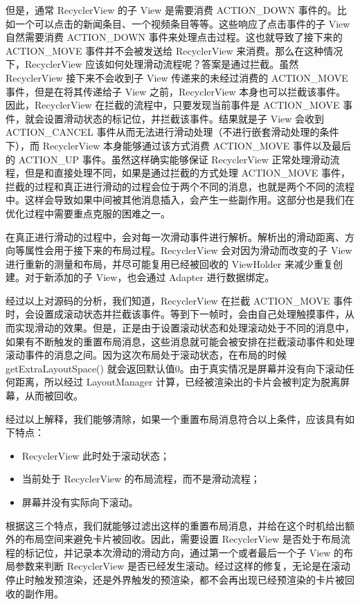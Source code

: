 但是，通常 RecyclerView 的子 View 是需要消费 ACTION\_DOWN 事件的。比如一个可以点击的新闻条目、一个视频条目等等。这些响应了点击事件的子 View 自然需要消费 ACTION\_DOWN 事件来处理点击过程。这也就导致了接下来的 ACTION\_MOVE 事件并不会被发送给 RecyclerView 来消费。那么在这种情况下，RecyclerView 应该如何处理滑动流程呢？答案是通过拦截。虽然 RecyclerView 接下来不会收到子 View 传递来的未经过消费的 ACTION\_MOVE 事件，但是在将其传递给子 View 之前，RecyclerView 本身也可以拦截该事件。因此，RecyclerView 在拦截的流程中，只要发现当前事件是 ACTION\_MOVE 事件，就会设置滑动状态的标记位，并拦截该事件。结果就是子 View 会收到 ACTION\_CANCEL 事件从而无法进行滑动处理（不进行嵌套滑动处理的条件下），而 RecyclerView 本身能够通过该方式消费 ACTION\_MOVE 事件以及最后的 ACTION\_UP 事件。虽然这样确实能够保证 RecyclerView 正常处理滑动流程，但是和直接处理不同，如果是通过拦截的方式处理 ACTION\_MOVE 事件，拦截的过程和真正进行滑动的过程会位于两个不同的消息，也就是两个不同的流程中。这样会导致如果中间被其他消息插入，会产生一些副作用。这部分也是我们在优化过程中需要重点克服的困难之一。

在真正进行滑动的过程中，会对每一次滑动事件进行解析。解析出的滑动距离、方向等属性会用于接下来的布局过程。RecyclerView 会对因为滑动而改变的子 View 进行重新的测量和布局，并尽可能复用已经被回收的 ViewHolder 来减少重复创建。对于新添加的子 View，也会通过 Adapter 进行数据绑定。

经过以上对源码的分析，我们知道，RecyclerView 在拦截 ACTION\_MOVE 事件时，会设置成滚动状态并拦截该事件。等到下一帧时，会由自己处理触摸事件，从而实现滑动的效果。但是，正是由于设置滚动状态和处理滚动处于不同的消息中，如果有不断触发的重置布局消息，这些消息就可能会被安排在拦截滚动事件和处理滚动事件的消息之间。因为这次布局处于滚动状态，在布局的时候 getExtraLayoutSpace() 就会返回默认值0。由于真实情况是屏幕并没有向下滚动任何距离，所以经过 LayoutManager 计算，已经被渲染出的卡片会被判定为脱离屏幕，从而被回收。

经过以上解释，我们能够清除，如果一个重置布局消息符合以上条件，应该具有如下特点：

\begin{itemize}
    \item RecyclerView 此时处于滚动状态；
    \item 当前处于 RecyclerView 的布局流程，而不是滑动流程；
    \item 屏幕并没有实际向下滚动。
\end{itemize}

根据这三个特点，我们就能够过滤出这样的重置布局消息，并给在这个时机给出额外的布局空间来避免卡片被回收。因此，需要设置 RecyclerView 是否处于布局流程的标记位，并记录本次滑动的滑动方向，通过第一个或者最后一个子 View 的布局参数来判断 RecyclerView 是否已经发生滚动。经过这样的修复，无论是在滚动停止时触发预渲染，还是外界触发的预渲染，都不会再出现已经预渲染的卡片被回收的副作用。